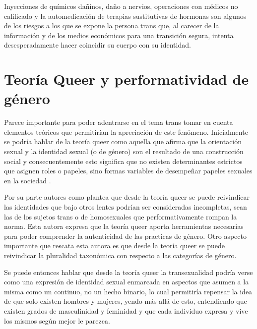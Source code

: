 Inyecciones de químicos dañinos, daño a nervios, operaciones con médicos no
calificado y la automedicación de terapias sustitutivas de hormonas son algunos
de los riesgos a los que se expone la persona trans que, al carecer de la
información y de los  medios económicos para una transición segura, intenta
desesperadamente hacer coincidir  su cuerpo con su identidad.


\section{Teoría Queer y performatividad de género}

Parece importante para poder adentrarse en el tema trans tomar en cuenta
elementos teóricos que permitirían la apreciación de este fenómeno. Inicialmente
se podría hablar de la teoría queer como aquella que afirma que la orientación
sexual y la identidad sexual (o de género) son el resultado de una construcción
social y consecuentemente esto significa que no existen determinantes estrictos
que asignen roles o papeles, sino formas variables de desempeñar papeles
sexuales en la sociedad \parencite{Fonseca2009}.

Por su parte autores como \textcite{Solana2013} plantea que desde la teoría
queer se puede reivindicar las identidades que bajo otros lentes podrían ser
consideradas incompletas, sean las de los sujetos trans o de homosexuales que
performativamente rompan la norma. Esta autora expresa que la teoría queer
aporta herramientas necesarias para poder comprender la autenticidad de las
practicas de género. Otro aspecto importante que rescata esta autora es que
desde la teoría queer se puede reivindicar la pluralidad taxonómica con respecto
a las categorías de género.

Se puede entonces hablar que desde la teoría queer la transexualidad podría
verse como una expresión de identidad sexual enmarcada en aspectos que asumen a
la misma como un continuo, no un hecho binario, lo cual permitiría repensar la
idea de que solo existen hombres y mujeres, yendo más allá de esto, entendiendo
que existen grados de masculinidad y feminidad y que cada individuo expresa y
vive los mismos según mejor le parezca.



